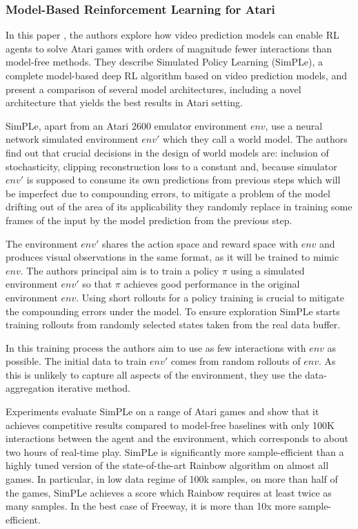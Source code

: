 \subsubsection{Model-Based Reinforcement Learning for Atari}

In this paper \cite{Algo.SimPLe}, the authors explore how video prediction models can enable RL agents to solve Atari games with orders of magnitude fewer interactions than model-free methods. They describe Simulated Policy Learning (SimPLe), a complete model-based deep RL algorithm based on video prediction models, and present a comparison of several model architectures, including a novel architecture that yields the best results in Atari setting.

SimPLe, apart from an Atari 2600 emulator environment $env$, use a neural network simulated environment $env'$ which they call a world model. The authors find out that crucial decisions in the design of world models are: inclusion of stochasticity, clipping reconstruction loss to a constant and, because simulator $env'$ is supposed to consume its own predictions from previous steps which will be imperfect due to compounding errors, to mitigate a problem of the model drifting out of the area of its applicability they randomly replace in training some frames of the input by the model prediction from the previous step. 

The environment $env'$ shares the action space and reward space with $env$ and produces visual observations in the same format, as it will be trained to mimic $env$. The authors principal aim is to train a policy $\pi$ using a simulated environment $env'$ so that $\pi$ achieves good performance in the original environment $env$. Using short rollouts for a policy training is crucial to mitigate the compounding errors under the model. To ensure exploration SimPLe starts training rollouts from randomly selected states taken from the real data buffer.

In this training process the authors aim to use as few interactions with $env$ as possible. The initial data to train $env'$ comes from random rollouts of $env$. As this is unlikely to capture all aspects of the environment, they use the data-aggregation iterative method.

Experiments evaluate SimPLe on a range of Atari games and show that it achieves competitive results compared to model-free baselines with only 100K interactions between the agent and the environment, which corresponds to about two hours of real-time play. SimPLe is significantly more sample-efficient than a highly tuned version of the state-of-the-art Rainbow algorithm \cite{Algo.Rainbow} on almost all games. In particular, in low data regime of 100k samples, on more than half of the games, SimPLe achieves a score which Rainbow requires at least twice as many samples. In the best case of Freeway, it is more than 10x more sample-efficient.

